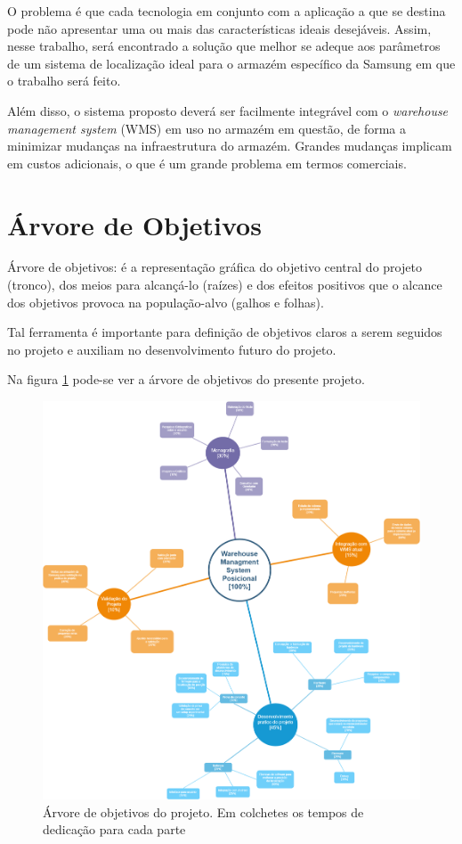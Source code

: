 O problema é que cada tecnologia em conjunto com a aplicação a que se destina pode não apresentar uma ou mais das características ideais desejáveis. Assim, nesse trabalho, será encontrado a solução que melhor se adeque aos parâmetros de um sistema de localização ideal para o armazém específico da Samsung em que o trabalho será feito.

Além disso, o sistema proposto deverá ser facilmente integrável com o \textit{warehouse management system} (WMS) em uso no armazém em questão, de forma a minimizar mudanças na infraestrutura do armazém. Grandes mudanças implicam em custos adicionais, o que é um grande problema em termos comerciais.

\section{Árvore de Objetivos}
Árvore de objetivos: é a representação gráfica do objetivo central do projeto (tronco), dos meios para alcançá-lo (raízes) e dos efeitos positivos que o alcance dos objetivos provoca na população-alvo (galhos e folhas). \cite{Buvinich}

Tal ferramenta é importante para definição de objetivos claros a serem seguidos no projeto e auxiliam no desenvolvimento futuro do projeto.

Na figura \ref{fig:arvore_objetivos} pode-se ver a árvore de objetivos do presente projeto.

\begin{figure}
	\includegraphics[width=\linewidth]{images/arvore_objetivos.png}
	\caption{Árvore de objetivos do projeto. Em colchetes os tempos de dedicação para cada parte}
	\label{fig:arvore_objetivos}
  \end{figure}
